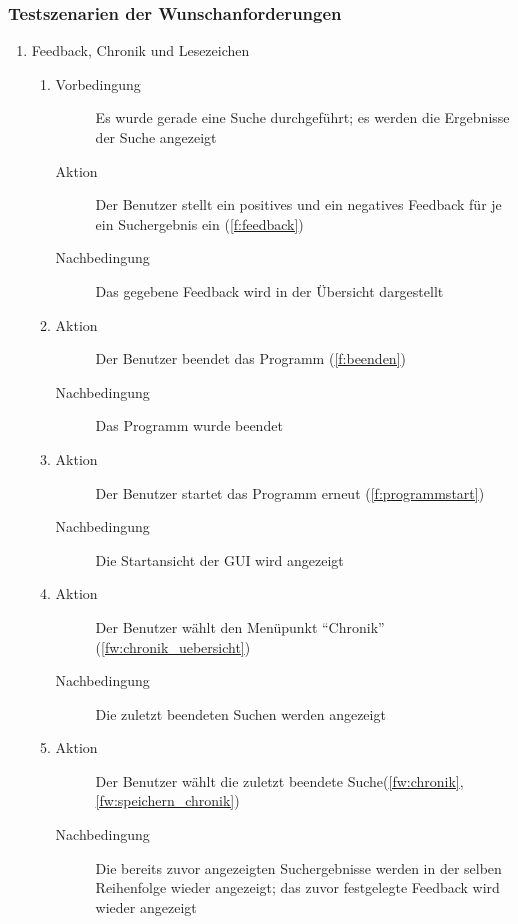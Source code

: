 \subsubsection{Testszenarien der Wunschanforderungen}
\begin{enumerate} [label=\bfseries /TSW \arabic*0/, leftmargin=*]
	\item Feedback, Chronik und Lesezeichen \label{ts:feedback_chronik_lesezeichen}
	\begin{enumerate}[leftmargin=0pt]
		\item
		\begin{description}
			\item[Vorbedingung] Es wurde gerade eine Suche durchgeführt; es werden die Ergebnisse der Suche angezeigt
			\item[Aktion] Der Benutzer stellt ein positives und ein negatives Feedback für je ein Suchergebnis ein (\ref{f:feedback})
			\item[Nachbedingung] Das gegebene Feedback wird in der Übersicht dargestellt
		\end{description}
		\item
		\begin{description}
			\item[Aktion] Der Benutzer beendet das Programm (\ref{f:beenden})
			\item[Nachbedingung] Das Programm wurde beendet
		\end{description}
		\item
		\begin{description}
			\item[Aktion] Der Benutzer startet das Programm erneut (\ref{f:programmstart})
			\item[Nachbedingung] Die Startansicht der GUI wird angezeigt
		\end{description}
		\item
		\begin{description}
			\item[Aktion] Der Benutzer wählt den Menüpunkt \enquote{Chronik} (\ref{fw:chronik_uebersicht})
			\item[Nachbedingung] Die zuletzt beendeten Suchen werden angezeigt
		\end{description}
		\item
		\begin{description}
			\item[Aktion] Der Benutzer wählt die zuletzt beendete Suche(\ref{fw:chronik}, \ref{fw:speichern_chronik})
			\item[Nachbedingung] Die bereits zuvor angezeigten Suchergebnisse werden in der selben Reihenfolge wieder angezeigt; das zuvor festgelegte Feedback wird wieder angezeigt

\end{description}
\end{enumerate}
\end{enumerate}
